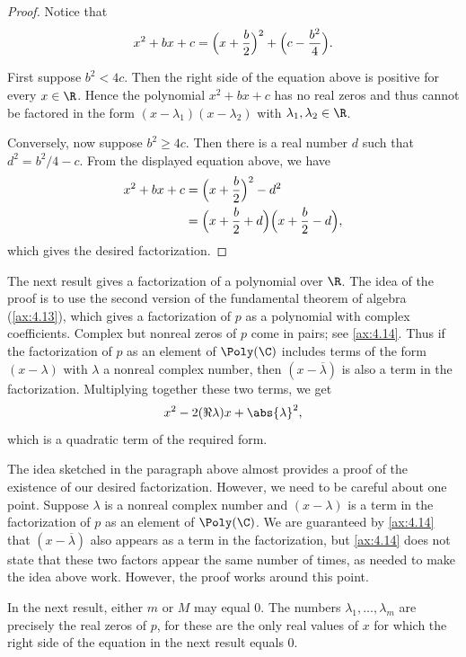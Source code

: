 \begin{proof}
Notice that
\[ x^2+bx+c = \Bigl(x+\frac{b}{2}\Bigr)^2+\Bigl(c-\frac{b^2}{4}\Bigr). \]

%
First suppose $b^2<4c$. Then the right side of the equation above is positive
for every $x\in\R$. Hence the polynomial $x^2+bx+c$ has no real zeros and thus
cannot be factored in the form $(x-\lambda_1)(x-\lambda_2)$ with
$\lambda_1,\lambda_2\in\R$.

Conversely, now suppose $b^2\ge4c$. Then there is a real number $d$ such that
$d^2=b^2/4-c$. From the displayed equation above, we have
\begin{align*}
x^2+bx+c &= \Bigl(x+\frac{b}{2}\Bigr)^2-d^2\\
  &= \Bigl(x+\frac{b}{2}+d\Bigr)\Bigl(x+\frac{b}{2}-d\Bigr),
\end{align*}
which gives the desired factorization.
\end{proof}

The next result gives a factorization of a polynomial over $\R$. The idea of
the proof is to use the second version of the fundamental theorem of algebra
(\ref{ax:4.13}), which gives a factorization of $p$ as a polynomial with
complex coefficients. Complex but nonreal zeros of $p$ come in pairs; see
\ref{ax:4.14}. Thus if the factorization of $p$ as an element of $\Poly(\C)$
includes terms of the form $(x-\lambda)$ with $\lambda$ a nonreal complex
number, then $(x-\overline{\lambda})$ is also a term in the factorization.
Multiplying together these two terms, we get
\[ x^2-2(\Re\lambda)x+\abs{\lambda}^2, \]
which is a quadratic term of the required form.

The idea sketched in the paragraph above almost provides a proof of the
existence of our desired factorization. However, we need to be careful about
one point. Suppose $\lambda$ is a nonreal complex number and $(x-\lambda)$ is a
term in the factorization of $p$ as an element of $\Poly(\C)$. We are
guaranteed by \ref{ax:4.14} that $(x-\overline{\lambda})$ also appears as a
term in the factorization, but \ref{ax:4.14} does not state that these two
factors appear the same number of times, as needed to make the idea above work.
However, the proof works around this point.

In the next result, either $m$ or $M$ may equal $0$. The numbers
$\lambda_1,\dots,\lambda_m$ are precisely the real zeros of $p$, for these are
the only real values of $x$ for which the right side of the equation in the
next result equals $0$.

